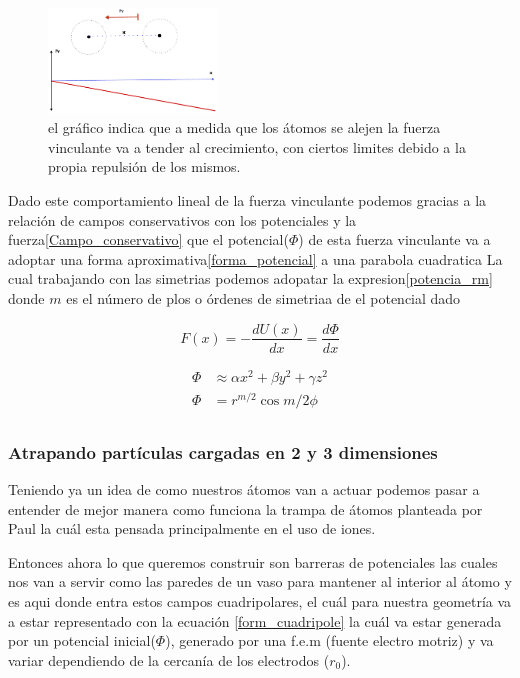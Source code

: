 \documentclass{article}
\begin{document}
\begin{figure}\label{fuerza_vinculante}
    \centering
    \includegraphics[width=0.4\textwidth]{atomos.pdf}
    \caption{el gráfico indica que a medida que los átomos se alejen la fuerza vinculante va a tender al crecimiento, con ciertos limites debido a la propia repulsión de los mismos. }
\end{figure}


Dado este comportamiento lineal de la fuerza vinculante podemos gracias a la relación de campos
conservativos con los potenciales y la fuerza\eqref{Campo_conservativo} que el potencial($\Phi$) de esta 
fuerza vinculante va a adoptar una forma aproximativa\eqref{forma_potencial} a una parabola cuadratica La
cual trabajando con las simetrias podemos adopatar la expresion\eqref{potencia_rm} donde $m$ es el número de plos o órdenes de
simetriaa de el potencial dado


\begin{equation}\label{Campo_conservativo}
    F(x)=-\frac{dU(x)}{dx}=\frac{d\Phi}{dx}
\end{equation}

\begin{align}
    \Phi    &\approx \alpha x^2+\beta y^2+\gamma z^2\label{forma_potencial} \\
    \Phi    &= r^{m/2}\cos{m/2\phi} \label{potencia_rm}\\
\end{align}

\subsubsection*{Atrapando partículas cargadas en 2 y 3 dimensiones}

Teniendo ya un idea de como nuestros átomos van a actuar podemos pasar a 
entender de mejor manera como funciona la trampa de átomos planteada por Paul
la cuál esta pensada principalmente en el uso de iones.

Entonces ahora lo que queremos construir son barreras de potenciales las 
cuales nos van a servir como las paredes de un vaso para mantener al interior
al átomo y es aqui donde entra estos campos cuadripolares, el cuál para nuestra
geometría va a estar representado con la ecuación \eqref{form_cuadripole} la cuál
va estar generada por un potencial inicial($\Phi$), generado por una f.e.m (fuente electro motriz)
y va variar dependiendo de la cercanía de los electrodos ($r_0$).
\end{document}
